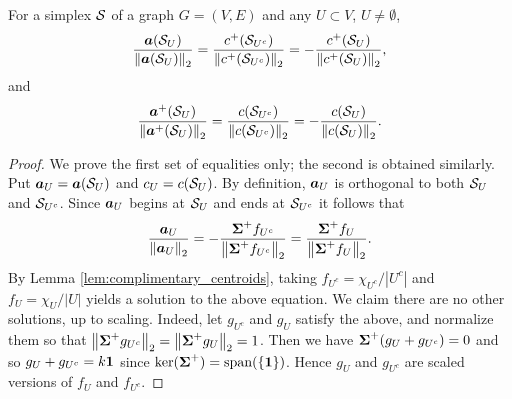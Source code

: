 \begin{lemma}
\label{lem:alt_and_centroid}
For a simplex $\mathcal{S}$ of a graph $G=(V,E)$ and any $U\subset V$, $U\neq\emptyset$, 
\begin{equation*}
    \frac{\vb*{a}(\mathcal{S}_U)}{\norm{\vb*{a}(\mathcal{S}_{U})}_2}=\frac{c^+(\mathcal{S}_{U^c})}{\norm{c^+(\mathcal{S}_{U^c})}_2}=-\frac{c^+(\mathcal{S}_{U})}{\norm{c^+(\mathcal{S}_{U})}_2},
\end{equation*}
and 
\begin{equation*}
    \frac{\vb*{a}^+(\mathcal{S}_U)}{\norm{\vb*{a}^+(\mathcal{S}_{U})}_2}=\frac{c(\mathcal{S}_{U^c})}{\norm{c(\mathcal{S}_{U^c})}_2}=-\frac{c(\mathcal{S}_{U})}{\norm{c(\mathcal{S}_{U})}_2}.
\end{equation*}
\end{lemma}
\begin{proof}
We prove the first set of  equalities only; the second is obtained similarly. 
Put $\vb*{a}_U=\vb*{a}(\mathcal{S}_U)$ and $c_U=c(\mathcal{S}_U)$. By definition, $\vb*{a}_U$ is orthogonal to both $\mathcal{S}_U$ and $\mathcal{S}_{U^c}$.  Since $\vb*{a}_U$ begins at $\mathcal{S}_U$ and ends at $\mathcal{S}_{U^c}$ it follows that 
\begin{equation*}
    \frac{\vb*{a}_U}{\norm{\vb*{a}_U}_2}=-\frac{\boldsymbol{\Sigma}^+f_{U^c}}{\norm{\boldsymbol{\Sigma}^+f_{U^c}}_2}=\frac{\boldsymbol{\Sigma}^+f_{U}}{\norm{\boldsymbol{\Sigma}^+f_{U}}_2}.
\end{equation*}
By Lemma \ref{lem:complimentary_centroids}, taking $f_{U^c}=\chi_{U^c}/|U^c|$ and $f_U=\chi_U/|U|$ yields a solution to the above equation. We claim there are no other solutions, up to scaling. Indeed, let $g_{U^c}$ and $g_U$ satisfy the above, and normalize them so that $\norm{\boldsymbol{\Sigma}^+g_{U^c}}_2=\norm{\boldsymbol{\Sigma}^+g_U}_2=1$. Then we have $\boldsymbol{\Sigma}^+(g_U+g_{U^c})=0$ and so $g_U+g_{U^c}=k\vb{1}$ since $\ker(\boldsymbol{\Sigma}^+)=\textnormal{span}(\{\vb{1}\})$. Hence $g_U$ and $g_{U^c}$ are scaled versions of $f_U$ and $f_{U^c}$.  
\end{proof}

